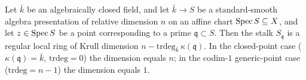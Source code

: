\begin{lemma}
  \label{mk-lem:stage6_regular_stalk_assembly}

  Let \(\bar k\) be an algebraically closed field, and let
  \(\bar k \to S\) be a standard-smooth algebra presentation of
  relative dimension \(n\) on an affine chart \(\operatorname{Spec} S \subseteq X\),
  and let \(z \in \operatorname{Spec} S\) be a point corresponding to a prime
  \(\mathfrak q \subset S\). Then the stalk \(S_{\mathfrak q}\) is a
  regular local ring of Krull dimension
  \(n - \mathrm{trdeg}_{\bar k}\,\kappa(\mathfrak q)\). In the
  closed-point case (\(\kappa(\mathfrak q) = \bar k\),
  \(\mathrm{trdeg} = 0\)) the dimension equals \(n\); in the
  codim-\(1\) generic-point case (\(\mathrm{trdeg} = n - 1\)) the
  dimension equals \(1\).
\end{lemma}

